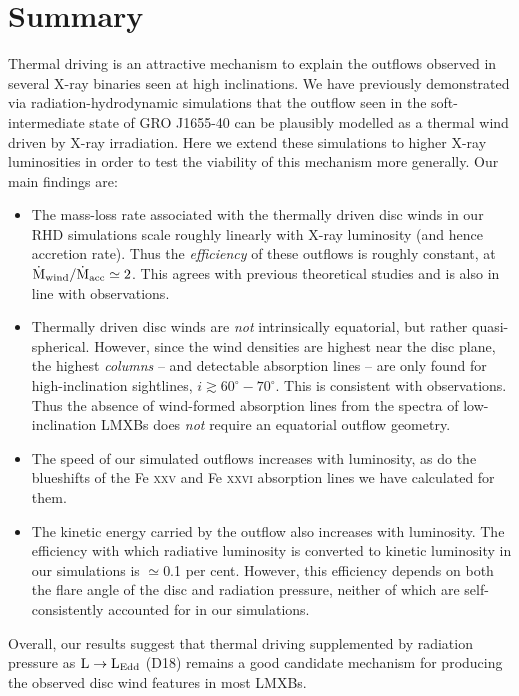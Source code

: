 \documentclass[a4paper,fleqn,usenatbib]{mnras}
\begin{document}
\section{Summary}

Thermal driving is an attractive mechanism to explain the outflows
observed in several X-ray binaries seen at high inclinations. We have
previously demonstrated via radiation-hydrodynamic simulations that
the outflow seen in the soft-intermediate state of GRO J1655-40 can be plausibly
modelled as a thermal wind driven by X-ray irradiation. Here we extend
these simulations to higher X-ray luminosities in order to test the
viability of this mechanism more generally. Our main findings are:

\begin{itemize}
\item{The mass-loss rate associated with the thermally driven disc
  winds in our RHD simulations scale roughly linearly with X-ray
  luminosity (and hence accretion rate). Thus the {\em efficiency} of
  these outflows is roughly constant, at
  $\dot{\rm{M}}_{\rm{wind}}/\dot{\rm{M}}_{\rm{acc}} \simeq 2$. This
  agrees with previous theoretical studies and is also in line with
  observations.}
\item{Thermally driven disc winds are {\em not} intrinsically
  equatorial, but rather quasi-spherical. However, since the wind
  densities are highest near the disc plane, the highest {\em columns}
  -- and detectable absorption lines -- are only found for
  high-inclination sightlines, $i \gtrsim 60^\circ - 70^\circ$. This
  is consistent with observations. Thus the absence of wind-formed
  absorption lines from the spectra of low-inclination LMXBs does {\em
    not} require an equatorial outflow geometry.}
\item{The speed of our simulated outflows increases with luminosity, as do the
  blueshifts of the Fe \textsc{xxv} and Fe \textsc{xxvi} absorption
  lines we have calculated for them.}
\item{The kinetic energy carried by the outflow also increases with
  luminosity. The efficiency with which radiative
  luminosity is converted to kinetic luminosity in our simulations is
  $\simeq$0.1 per cent. However, this efficiency depends on both the flare
  angle of the disc and radiation pressure, neither of
  which are self-consistently accounted for in our simulations.}
\end{itemize}
Overall, our results suggest that thermal driving supplemented by 
radiation pressure as $\rm{L\rightarrow L_{Edd}}$ 
(D18) remains 
a good  candidate mechanism for producing the observed disc wind
features in most LMXBs.
\end{document}
